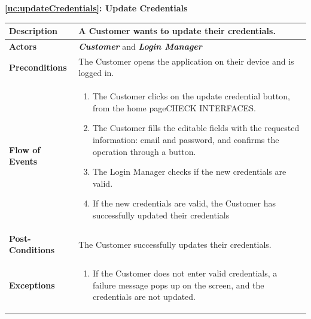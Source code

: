 \documentclass[a4paper, 10pt, oneside]{article}
\newcommand*{\lorenzo}[1]{\textcolor{BurntOrange}{#1}}
\begin{document}
\begin{center}
{\textbf{\ref{uc:updateCredentials}: Update Credentials}}
\end{center}
\begin{tabularx}{\linewidth}{| l | X |}
	
	\hline
	\textbf{Description} & A Customer wants to update their credentials.\\
	

	\hline
	\textbf{Actors} & \textbf{\textit{Customer}} and \textit{\textbf{Login Manager}}\\
	
	\hline
	\textbf{Preconditions} & The Customer opens the application on their device and is logged in.\\
	
	\hline
	\textbf{Flow of Events} & \parbox{0.7\textwidth}{	
		\begin{enumerate}
			\item The Customer clicks on the update credential button, from the home page\lorenzo{CHECK INTERFACES}.
			\item The Customer fills the editable fields with the requested information: email and password, and confirms the operation through a button.
			\item The Login Manager checks if the new credentials are valid. 
			\item If the new credentials are valid, the Customer has successfully updated their credentials
	\end{enumerate}}\\
	
	\hline
	\textbf{Post-Conditions} & The Customer successfully updates their credentials.\\
	
	\hline
	\textbf{Exceptions} & \parbox{0.7\textwidth}{ \begin{enumerate}
			\item If the Customer does not enter valid credentials, a failure message pops up on the screen, and the credentials are not updated.
		\end{enumerate}}\\

	\hline
	
\end{tabularx}
\end{document}

